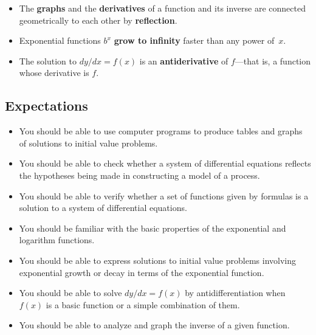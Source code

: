 \begin{itemize}
\item  The {\bf graphs} and the {\bf derivatives} of a function and its inverse are connected geometrically to each other by {\bf reflection}.  

\item  Exponential functions $b^{\displaystyle x}$ {\bf grow to infinity} faster than any power of~$x$.

\item  The solution to $dy/dx = f(x)$ is an {\bf antiderivative} of $f$---that is, a function whose derivative is $f$.


\end{itemize}


\subsection{Expectations}
\label{subsec:expectations}

\begin{itemize}

\item  You should be able to use computer programs to produce tables and graphs of solutions to initial value problems.

\item  You should be able to check whether a system of differential equations reflects the hypotheses being made in constructing a model of a process.

\item  You should be able to verify whether a set of functions given by formulas is a solution to a system of differential equations.

\item  You should be familiar with the basic properties of the exponential and logarithm functions.  

\item  You should be able to express solutions to initial value problems involving exponential growth or decay in terms of the exponential function.

\item  You should be able to solve $dy/dx = f(x)$ by antidifferentiation when $f(x)$ is a basic function or a simple combination of them.  

\item  You should be able to analyze and graph the inverse of a given function.


\end{itemize}

\cleardoublepage